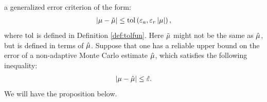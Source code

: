 \documentclass{iitthesis}
\theoremstyle{definition}
\begin{document}
a generalized error criterion of the form:
\begin{align}\left \lvert \mu -\tilde{\mu} \right \rvert \leq \operatorname{tol} \left(\varepsilon_a,\varepsilon_r \left \lvert \mu \right \rvert\right),\label{pointwisegeneralizederror} 
\end{align}
where $\operatorname{tol}$ is defined in Definition \ref{def:tolfun}. Here $\tilde{\mu}$ might not be the same as $\hat{\mu}$, but is defined in terms of $\hat{\mu}$. Suppose that one has a reliable upper bound on the error of a non-adaptive Monte Carlo estimate $\hat{\mu}$, which satisfies the following inequality:
\begin{align}
|\mu-\hat{\mu}| \leq \hat{\varepsilon}.  \label{pointwiseerrorbound} 
\end{align} We will have the proposition below.
\end{document}
